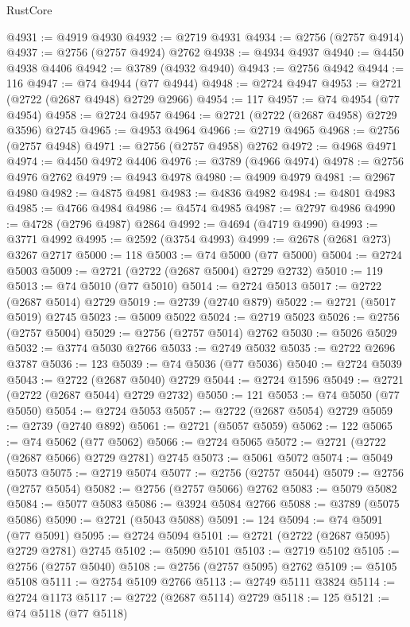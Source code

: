 \begin{lexlean}{RustCore}
\begin{coremodule}
@4931 := @4919 @4930
@4932 := @2719 @4931
@4934 := @2756 (@2757 @4914)
@4937 := @2756 (@2757 @4924) @2762
@4938 := @4934 @4937
@4940 := @4450 @4938 @4406
@4942 := @3789 (@4932 @4940)
@4943 := @2756 @4942
@4944 := 116
@4947 := @74 @4944 (@77 @4944)
@4948 := @2724 @4947
@4953 := @2721 (@2722 (@2687 @4948) @2729 @2966)
@4954 := 117
@4957 := @74 @4954 (@77 @4954)
@4958 := @2724 @4957
@4964 := @2721 (@2722 (@2687 @4958) @2729 @3596) @2745
@4965 := @4953 @4964
@4966 := @2719 @4965
@4968 := @2756 (@2757 @4948)
@4971 := @2756 (@2757 @4958) @2762
@4972 := @4968 @4971
@4974 := @4450 @4972 @4406
@4976 := @3789 (@4966 @4974)
@4978 := @2756 @4976 @2762
@4979 := @4943 @4978
@4980 := @4909 @4979
@4981 := @2967 @4980
@4982 := @4875 @4981
@4983 := @4836 @4982
@4984 := @4801 @4983
@4985 := @4766 @4984
@4986 := @4574 @4985
@4987 := @2797 @4986
@4990 := @4728 (@2796 @4987) @2864
@4992 := @4694 (@4719 @4990)
@4993 := @3771 @4992
@4995 := @2592 (@3754 @4993)
@4999 := @2678 (@2681 @273) @3267 @2717
@5000 := 118
@5003 := @74 @5000 (@77 @5000)
@5004 := @2724 @5003
@5009 := @2721 (@2722 (@2687 @5004) @2729 @2732)
@5010 := 119
@5013 := @74 @5010 (@77 @5010)
@5014 := @2724 @5013
@5017 := @2722 (@2687 @5014) @2729
@5019 := @2739 (@2740 @879)
@5022 := @2721 (@5017 @5019) @2745
@5023 := @5009 @5022
@5024 := @2719 @5023
@5026 := @2756 (@2757 @5004)
@5029 := @2756 (@2757 @5014) @2762
@5030 := @5026 @5029
@5032 := @3774 @5030 @2766
@5033 := @2749 @5032
@5035 := @2722 @2696 @3787
@5036 := 123
@5039 := @74 @5036 (@77 @5036)
@5040 := @2724 @5039
@5043 := @2722 (@2687 @5040) @2729
@5044 := @2724 @1596
@5049 := @2721 (@2722 (@2687 @5044) @2729 @2732)
@5050 := 121
@5053 := @74 @5050 (@77 @5050)
@5054 := @2724 @5053
@5057 := @2722 (@2687 @5054) @2729
@5059 := @2739 (@2740 @892)
@5061 := @2721 (@5057 @5059)
@5062 := 122
@5065 := @74 @5062 (@77 @5062)
@5066 := @2724 @5065
@5072 := @2721 (@2722 (@2687 @5066) @2729 @2781) @2745
@5073 := @5061 @5072
@5074 := @5049 @5073
@5075 := @2719 @5074
@5077 := @2756 (@2757 @5044)
@5079 := @2756 (@2757 @5054)
@5082 := @2756 (@2757 @5066) @2762
@5083 := @5079 @5082
@5084 := @5077 @5083
@5086 := @3924 @5084 @2766
@5088 := @3789 (@5075 @5086)
@5090 := @2721 (@5043 @5088)
@5091 := 124
@5094 := @74 @5091 (@77 @5091)
@5095 := @2724 @5094
@5101 := @2721 (@2722 (@2687 @5095) @2729 @2781) @2745
@5102 := @5090 @5101
@5103 := @2719 @5102
@5105 := @2756 (@2757 @5040)
@5108 := @2756 (@2757 @5095) @2762
@5109 := @5105 @5108
@5111 := @2754 @5109 @2766
@5113 := @2749 @5111 @3824
@5114 := @2724 @1173
@5117 := @2722 (@2687 @5114) @2729
@5118 := 125
@5121 := @74 @5118 (@77 @5118)

\end{coremodule}
\end{lexlean}
